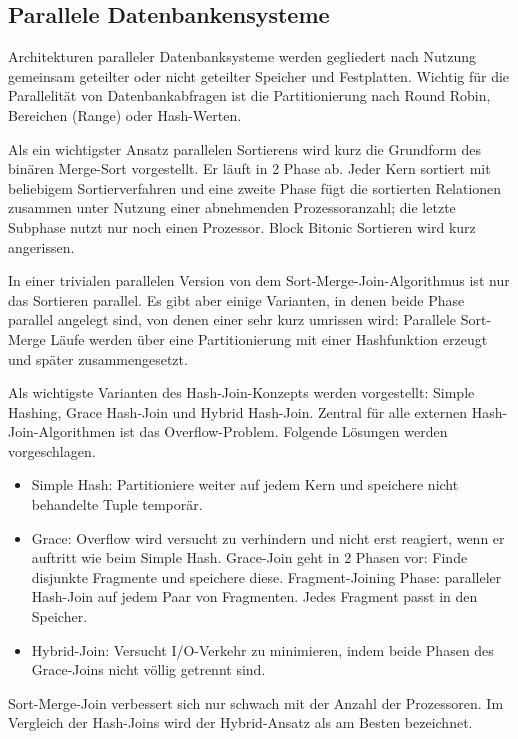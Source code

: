 \documentclass[a4paper,12pt,twoside]{article}
\begin{document}
\subsection{Parallele Datenbankensysteme}

\textbf{}

Architekturen paralleler Datenbanksysteme werden gegliedert nach Nutzung gemeinsam geteilter oder nicht geteilter Speicher und Festplatten. Wichtig für die Parallelität von Datenbankabfragen ist die Partitionierung nach Round Robin, Bereichen (Range) oder Hash-Werten.

Als ein wichtigster Ansatz parallelen Sortierens wird kurz die Grundform des binären Merge-Sort vorgestellt. Er läuft in 2 Phase ab. Jeder Kern sortiert mit beliebigem Sortierverfahren und eine zweite Phase fügt die sortierten Relationen zusammen unter Nutzung einer abnehmenden Prozessoranzahl; die letzte Subphase nutzt nur noch einen Prozessor. Block Bitonic Sortieren wird kurz angerissen. 

In einer trivialen parallelen Version von dem Sort-Merge-Join-Algorithmus ist nur das Sortieren parallel. Es gibt aber einige Varianten, in denen beide Phase parallel angelegt sind, von denen einer sehr kurz umrissen wird: Parallele Sort-Merge Läufe werden über eine Partitionierung mit einer Hashfunktion erzeugt und später zusammengesetzt.

Als wichtigste Varianten des Hash-Join-Konzepts werden vorgestellt: Simple Hashing, Grace Hash-Join und Hybrid Hash-Join. Zentral für alle externen Hash-Join-Algorithmen ist das Overflow-Problem. Folgende Lösungen werden vorgeschlagen.

\begin{itemize}
	\item Simple Hash: Partitioniere weiter auf jedem Kern und speichere nicht behandelte Tuple temporär.
	\item Grace: Overflow wird versucht zu verhindern und nicht erst reagiert, wenn er auftritt wie beim Simple Hash. Grace-Join geht in 2 Phasen vor: Finde disjunkte Fragmente und speichere diese. Fragment-Joining Phase: paralleler Hash-Join auf jedem Paar von Fragmenten. Jedes Fragment passt in den Speicher.
	\item Hybrid-Join: Versucht I/O-Verkehr zu minimieren, indem beide Phasen des Grace-Joins nicht völlig getrennt sind.
\end{itemize}

Sort-Merge-Join verbessert sich nur schwach mit der Anzahl der Prozessoren. Im Vergleich der Hash-Joins wird der Hybrid-Ansatz als am Besten bezeichnet.
\end{document}
